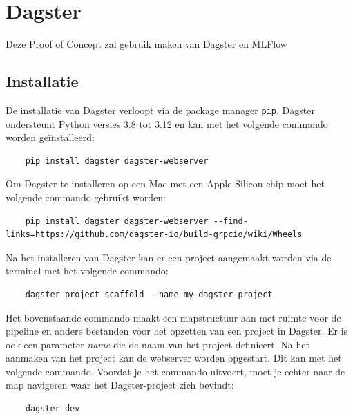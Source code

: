 \section{Dagster}
Deze Proof of Concept zal gebruik maken van Dagster en MLFlow
\subsection{Installatie}
De installatie van Dagster verloopt via de package manager \texttt{pip}. Dagster ondersteunt Python versies 3.8 tot 3.12 en kan met het volgende commando worden geïnstalleerd:
\begin{verbatim}
    pip install dagster dagster-webserver
\end{verbatim}
Om Dagster te installeren op een Mac met een Apple Silicon chip moet het volgende commando gebruikt worden:
\begin{verbatim}
    pip install dagster dagster-webserver --find-links=https://github.com/dagster-io/build-grpcio/wiki/Wheels
\end{verbatim}

Na het installeren van Dagster kan er een project aangemaakt worden via de terminal met het volgende commando:
\begin{verbatim}
    dagster project scaffold --name my-dagster-project
\end{verbatim}
Het bovenstaande commando maakt een mapstructuur aan met ruimte voor de pipeline en andere bestanden voor het opzetten van een project in Dagster. Er is ook een parameter \textit{name} die de naam van het project definieert.
Na het aanmaken van het project kan de webserver worden opgestart. Dit kan met het volgende commando. Voordat je het commando uitvoert, moet je echter naar de map navigeren waar het Dagster-project zich bevindt:
\begin{verbatim}
    dagster dev
\end{verbatim}
